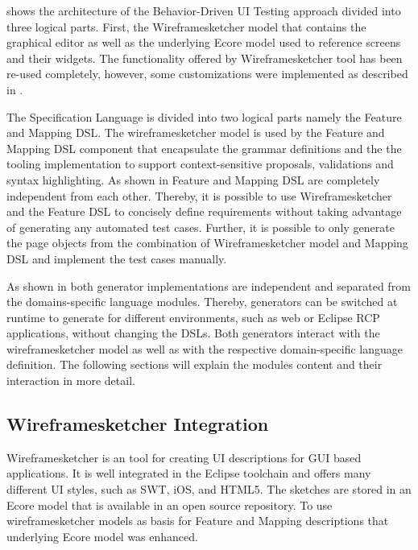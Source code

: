 \documentclass{sig-alternate-05-2015}
\begin{document}
{ shows the architecture of the Behavior-Driven UI Testing approach divided into three logical parts. 
First, the Wireframesketcher model that contains the graphical editor as well as the underlying Ecore model used to reference screens and their widgets.
The functionality offered by Wireframesketcher tool has been re-used completely, however, some customizations were implemented as described in .

The Specification Language is divided into two logical parts namely the Feature and Mapping DSL.
The wireframesketcher model is used by the Feature and Mapping DSL component that encapsulate the grammar definitions and the the tooling implementation to support context-sensitive proposals, validations and syntax highlighting.
As shown in  Feature and Mapping DSL are completely independent from each other.
Thereby, it is possible to use Wireframesketcher and the Feature DSL to concisely define requirements without taking advantage of generating any automated test cases.
Further, it is possible to only generate the page objects from the combination of Wireframesketcher model and Mapping DSL and implement the test cases manually.

As shown in  both generator implementations are independent and separated from the domains-specific language modules.
Thereby, generators can be switched at runtime to generate for different environments, such as web or Eclipse RCP applications, without changing the DSLs.
Both generators interact with the wireframesketcher model as well as with the respective domain-specific language definition.
The following sections will explain the modules content and their interaction in more detail.

\subsection{Wireframesketcher Integration}\label{sec:WireframesketcherIntegration} 
Wireframesketcher is an tool for creating UI descriptions for GUI based applications. 
It is well integrated in the Eclipse toolchain and offers many different UI styles, such as SWT, iOS, and HTML5.
The sketches are stored in an Ecore model that is available in an open source repository.
To use wireframesketcher models as basis for Feature and Mapping descriptions that underlying Ecore model was enhanced.

}
\end{document}
